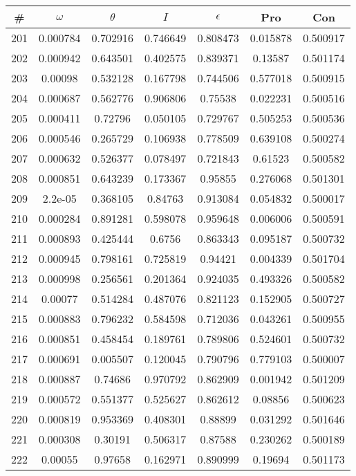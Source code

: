\newpage
\begin{table}
\begin{tabular}{c|c|c|c|c|c|c}
\# & $\omega$ & $\theta$ & $I$ & $\epsilon$ & Pro & Con\\
\hline
201 & 0.000784 & 0.702916 & 0.746649 & 0.808473 & 0.015878 & 0.500917\\
202 & 0.000942 & 0.643501 & 0.402575 & 0.839371 & 0.13587 & 0.501174\\
203 & 0.00098 & 0.532128 & 0.167798 & 0.744506 & 0.577018 & 0.500915\\
204 & 0.000687 & 0.562776 & 0.906806 & 0.75538 & 0.022231 & 0.500516\\
205 & 0.000411 & 0.72796 & 0.050105 & 0.729767 & 0.505253 & 0.500536\\
206 & 0.000546 & 0.265729 & 0.106938 & 0.778509 & 0.639108 & 0.500274\\
207 & 0.000632 & 0.526377 & 0.078497 & 0.721843 & 0.61523 & 0.500582\\
208 & 0.000851 & 0.643239 & 0.173367 & 0.95855 & 0.276068 & 0.501301\\
209 & 2.2e-05 & 0.368105 & 0.84763 & 0.913084 & 0.054832 & 0.500017\\
210 & 0.000284 & 0.891281 & 0.598078 & 0.959648 & 0.006006 & 0.500591\\
211 & 0.000893 & 0.425444 & 0.6756 & 0.863343 & 0.095187 & 0.500732\\
212 & 0.000945 & 0.798161 & 0.725819 & 0.94421 & 0.004339 & 0.501704\\
213 & 0.000998 & 0.256561 & 0.201364 & 0.924035 & 0.493326 & 0.500582\\
214 & 0.00077 & 0.514284 & 0.487076 & 0.821123 & 0.152905 & 0.500727\\
215 & 0.000883 & 0.796232 & 0.584598 & 0.712036 & 0.043261 & 0.500955\\
216 & 0.000851 & 0.458454 & 0.189761 & 0.789806 & 0.524601 & 0.500732\\
217 & 0.000691 & 0.005507 & 0.120045 & 0.790796 & 0.779103 & 0.500007\\
218 & 0.000887 & 0.74686 & 0.970792 & 0.862909 & 0.001942 & 0.501209\\
219 & 0.000572 & 0.551377 & 0.525627 & 0.862612 & 0.08856 & 0.500623\\
220 & 0.000819 & 0.953369 & 0.408301 & 0.88899 & 0.031292 & 0.501646\\
221 & 0.000308 & 0.30191 & 0.506317 & 0.87588 & 0.230262 & 0.500189\\
222 & 0.00055 & 0.97658 & 0.162971 & 0.890999 & 0.19694 & 0.501173\\

\end{tabular}
\end{table}
